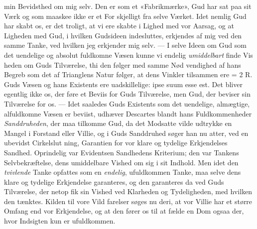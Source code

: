 \documentclass[12pt,a4paper]{book}
\begin{document}
min Bevidsthed om mig selv. Den er som et «Fabrikmærke»,
Gud har sat paa sit Værk og som maaskee ikke er et For\-%
skjelligt fra selve Værket. Idet nemlig Gud har skabt os, er
det troligt, at vi ere skabte i Lighed med vor Aarsag, og at
Ligheden med Gud, i hvilken Gudsideen indesluttes, erkjendes
af mig ved den samme Tanke, ved hvilken jeg erkjender mig
selv. --- I selve Ideen om Gud som det uendelige og absolut
fuldkomne Væsen kunne vi endelig \emph{umiddelbart} finde Vis\-%
heden om Guds Tilværelse, thi den følger med samme Nød\-%
vendighed af hans Begreb som det af Trianglens Natur følger,
at dens Vinkler tilsammen ere = 2 R. Guds Væsen og hans
Existents ere uadskillelige: ipse suum esse est. Det bliver
egentlig ikke os, der føre et Beviis for Guds Tilværelse, men
Gud, der beviser sin Tilværelse for os. --- Idet saaledes Guds
Existents som det uendelige, almægtige, alfuldkomne Væsen
er beviist, udhæver Descartes blandt hans Fuldkommenheder
\emph{Sanddruheden}, der maa tilkomme Gud, da det Modsatte
vilde udtrykke en Mangel i Forstand eller Villie, og i Guds
Sanddruhed søger han nu atter, ved en ubevidst Cirkelslut\-%
ning, Garantien for vor klare og tydelige Erkjendelses Sandhed.
Oprindelig var Evidentsen Sandhedens Kriterium; den var
Tankens Selvbekræftelse, dens umiddelbare Vished om sig
i sit Indhold. Men idet den \emph{tvivlende} Tanke opfattes som
en \emph{endelig}, ufuldkommen Tanke, maa selve dens klare og
tydelige Erkjendelse garanteres, og den garanteres da ved
Guds Tilværelse, der netop fik sin Vished ved Klarheden og
Tydeligheden, med hvilken den tænktes. Kilden til vore Vild\-%
farelser søges nu deri, at vor Villie har et større Omfang end
vor Erkjendelse, og at den fører os til at fælde en Dom ogsaa
der, hvor Indsigten kun er ufuldkommen.
\end{document}
